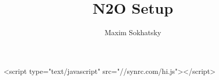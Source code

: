 

\title{N2O Setup}
\author{Maxim Sokhatsky}


\begin{rawhtml}
<script type="text/javascript" src="//synrc.com/hi.js"></script>
\end{rawhtml}
